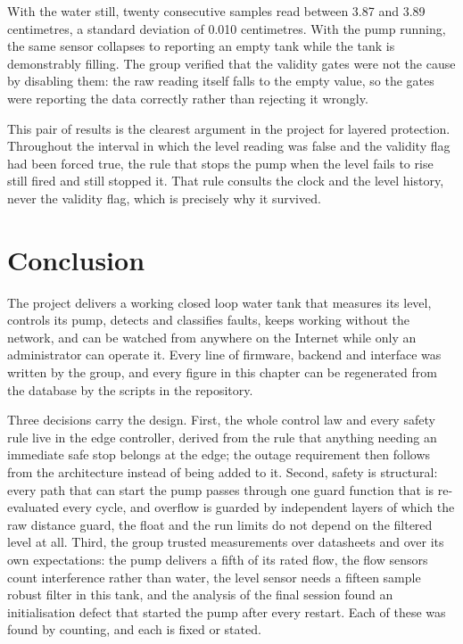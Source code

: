 With the water still, twenty consecutive samples read between 3.87 and 3.89 centimetres, a standard deviation of 0.010 centimetres. With the pump running, the same sensor collapses to reporting an empty tank while the tank is demonstrably filling. The group verified that the validity gates were not the cause by disabling them: the raw reading itself falls to the empty value, so the gates were reporting the data correctly rather than rejecting it wrongly.

This pair of results is the clearest argument in the project for layered protection. Throughout the interval in which the level reading was false and the validity flag had been forced true, the rule that stops the pump when the level fails to rise still fired and still stopped it. That rule consults the clock and the level history, never the validity flag, which is precisely why it survived.

\section{Conclusion}

The project delivers a working closed loop water tank that measures its level, controls its pump, detects and classifies faults, keeps working without the network, and can be watched from anywhere on the Internet while only an administrator can operate it. Every line of firmware, backend and interface was written by the group, and every figure in this chapter can be regenerated from the database by the scripts in the repository.

Three decisions carry the design. First, the whole control law and every safety rule live in the edge controller, derived from the rule that anything needing an immediate safe stop belongs at the edge; the outage requirement then follows from the architecture instead of being added to it. Second, safety is structural: every path that can start the pump passes through one guard function that is re-evaluated every cycle, and overflow is guarded by independent layers of which the raw distance guard, the float and the run limits do not depend on the filtered level at all. Third, the group trusted measurements over datasheets and over its own expectations: the pump delivers a fifth of its rated flow, the flow sensors count interference rather than water, the level sensor needs a fifteen sample robust filter in this tank, and the analysis of the final session found an initialisation defect that started the pump after every restart. Each of these was found by counting, and each is fixed or stated.

